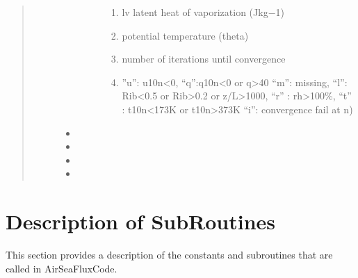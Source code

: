 \documentclass[letterpaper,10pt,english]{sphinxmanual}
\begin{document}
\begin{fulllineitems}
\begin{quote}
\begin{description}
\begin{itemize}
\begin{description}
\begin{enumerate}
\item {} 
\sphinxAtStartPar
lv latent heat of vaporization (Jkg−1)

\item {} 
\sphinxAtStartPar
potential temperature (theta)

\item {} 
\sphinxAtStartPar
number of iterations until convergence

\item {} \begin{description}
\sphinxAtStartPar
”u”: u10n\textless{}0, “q”:q10n\textless{}0 or q\textgreater{}40
“m”: missing,
“l”: Rib\textless{}\sphinxhyphen{}0.5 or Rib\textgreater{}0.2 or z/L\textgreater{}1000,
“r” : rh\textgreater{}100\%,
“t” : t10n\textless{}173K or t10n\textgreater{}373K
“i”: convergence fail at n)

\end{description}

\end{enumerate}

\end{description}

\item {} 
\sphinxAtStartPar
{}

\item {} 
\sphinxAtStartPar
{}

\item {} 
\sphinxAtStartPar
{}

\item {} 
\sphinxAtStartPar
{}

\end{itemize}


\end{description}\end{quote}

\end{fulllineitems}



\section{Description of Sub\sphinxhyphen{}Routines}
\label{\detokenize{users_guide:description-of-sub-routines}}
\sphinxAtStartPar
This section provides a description of the constants and sub\sphinxhyphen{}routines that are called in AirSeaFluxCode.
\end{document}
